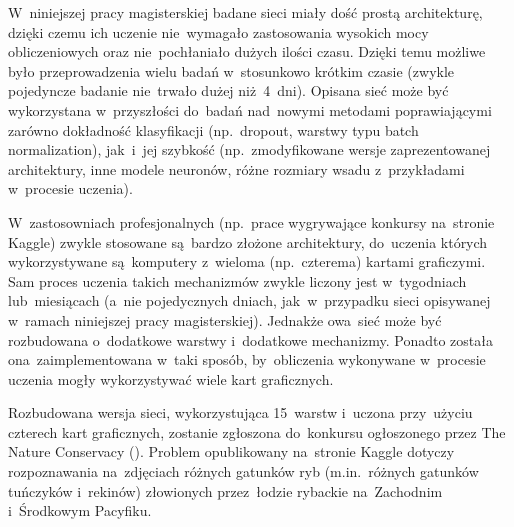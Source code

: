 W~niniejszej pracy magisterskiej badane sieci miały dość prostą architekturę, dzięki czemu ich uczenie nie~wymagało
zastosowania wysokich mocy obliczeniowych oraz nie~pochłaniało dużych ilości czasu. Dzięki temu możliwe było
przeprowadzenia wielu badań w~stosunkowo krótkim czasie (zwykle pojedyncze badanie nie~trwało dużej niż~4~dni).
Opisana sieć może być wykorzystana w~przyszłości do~badań nad~nowymi metodami poprawiającymi zarówno dokładność
klasyfikacji (np.~dropout, warstwy typu batch normalization), jak~i~jej szybkość (np.~zmodyfikowane wersje
zaprezentowanej architektury, inne modele neuronów, różne rozmiary wsadu z~przykładami w~procesie uczenia).

W~zastosowniach profesjonalnych (np.~prace wygrywające konkursy na~stronie Kaggle) zwykle stosowane są~bardzo złożone
architektury, do~uczenia których wykorzystywane są~komputery z~wieloma (np.~czterema) kartami graficzymi. Sam proces
uczenia takich mechanizmów zwykle liczony jest w~tygodniach lub~miesiącach (a~nie pojedycznych dniach, jak~w~przypadku
sieci opisywanej w~ramach niniejszej pracy magisterskiej). Jednakże owa~sieć może być rozbudowana o~dodatkowe warstwy
i~dodatkowe mechanizmy. Ponadto została ona~zaimplementowana w~taki sposób, by~obliczenia wykonywane w~procesie uczenia
mogły wykorzystywać wiele kart graficznych.

Rozbudowana wersja sieci, wykorzystująca 15~warstw i~uczona przy~użyciu czterech kart graficznych, zostanie zgłoszona
do~konkursu ogłoszonego przez The Nature Conservacy (\cite{nature-conservacy}). Problem opublikowany na~stronie Kaggle
dotyczy rozpoznawania na~zdjęciach różnych gatunków ryb (m.in.~różnych gatunków tuńczyków i~rekinów) złowionych
przez~łodzie rybackie na~Zachodnim i~Środkowym Pacyfiku.